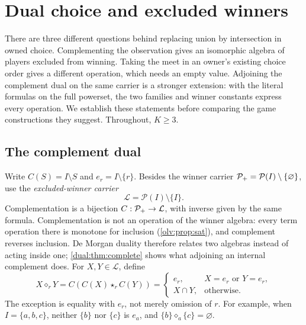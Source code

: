\section{Dual choice and excluded winners}\label{app:choice-duality}

There are three different questions behind replacing union by intersection
in owned choice. Complementing the observation gives an isomorphic algebra
of players excluded from winning. Taking the meet in an owner's existing
choice order gives a different operation, which needs an empty value.
Adjoining the complement dual on the same carrier is a stronger extension:
with the literal formulas on the full powerset, the two families and winner
constants express every operation. We establish these statements before
comparing the game constructions they suggest. Throughout, $K\geq3$.

\subsection{The complement dual}

Write $C(S)=I\setminus S$ and $e_r=I\setminus\{r\}$. Besides the
winner carrier $\mathcal P_+=\mathcal P(I)\setminus\{\varnothing\}$, use the
\emph{excluded-winner carrier}
\[
 \mathcal L=\mathcal P(I)\setminus\{I\}.
\]
Complementation is a bijection $C:\mathcal P_+\to\mathcal L$, with inverse
given by the same formula. Complementation is not an operation of the winner algebra: every term
operation there is monotone for inclusion (\cref{olv:prop:sat}), and
complement reverses inclusion. De Morgan duality therefore relates two
algebras instead of acting inside one; \cref{dual:thm:complete} shows
what adjoining an internal complement does. For $X,Y\in\mathcal L$, define
\begin{equation}\label{dual:eq:choice}
 X\diamond_r Y=C(C(X)\star_r C(Y))
 =\begin{cases}
 e_r,&X=e_r\text{ or }Y=e_r,\\
 X\cap Y,&\text{otherwise}.
 \end{cases}
\end{equation}
The exception is equality with $e_r$, not merely omission of $r$.
For example, when $I=\{a,b,c\}$, neither $\{b\}$ nor $\{c\}$ is
$e_a$, and $\{b\}\diamond_a\{c\}=\varnothing$.

